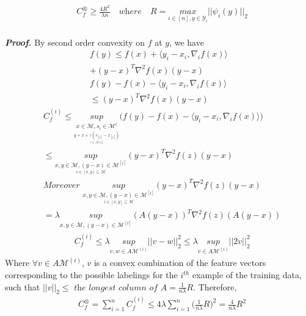 \documentclass{article}
\begin{document}
\begin{equation*}
\begin{aligned}
    &C^{\otimes}_{f} \geq \frac{4R^{2}}{\lambda n}
    \quad\textit{where} \quad R= \underset{i\in[n], y\in\mathcal{Y}_{i}}{max}||\psi_{i}(y)||_{2}
\end{aligned}
\end{equation*}
\\
\textbf{\textit{Proof.}} By second order convexity on $f$ at $y$, we have
\begin{align*}
    f(y)\leq f(x)+ \langle y_{i}-x_{i}, \nabla_{i} f(x)\rangle\\
    + (y- x)^{T}\nabla^{2}f(x)(y- x)\\
    f(y)- f(x)- \langle y_{i}-x_{i}, \nabla_{i} f(x)\rangle\\
    \leq (y- x)^{T}\nabla^{2}f(x)(y- x)
\end{align*}
\begin{equation*}
\begin{aligned}
    &C^{(i)}_{f}\leq\underset{\underset{\underset{\gamma\in[0,1]}{y=x+\gamma(s_{[i]}-x_{[i]})}}{x\in\mathcal{M},s_{i}\in\mathcal{M}^{i}}}{sup}\Big(f(y)- f(x)- \langle y_{i}-x_{i}, \nabla_{i} f(x)\rangle\Big)\\
    &\leq \underset{\underset{z\in[x,y]\subseteq\mathcal{M}}{x,y\in\mathcal{M},(y-x)\in\mathcal{M}^{[i]}}}{sup}(y- x)^{T}\nabla^{2}f(z)(y- x)\\
    &\textit{Moreover } \underset{\underset{z\in[x,y]\subseteq\mathcal{M}}{x,y\in\mathcal{M},(y-x)\in\mathcal{M}^{[i]}}}{sup}(y- x)^{T}\nabla^{2}f(z)(y- x)\\
    &= \lambda \underset{{x,y\in\mathcal{M},(y-x)\in\mathcal{M}^{[i]}}}{sup}(A(y- x))^{T}\nabla^{2}f(z)(A(y- x))
\end{aligned}
\end{equation*}
\begin{equation*}
\begin{aligned}
    &C^{(i)}_{f}\leq \lambda \underset{v,w\in A\mathcal{M}^{(i)}}{sup}||v- w||^{2}_{2}\leq \lambda \underset{v\in A\mathcal{M}^{(i)}}{sup}||2v||^{2}_{2}
\end{aligned}
\end{equation*}
Where $\forall v\in A\mathcal{M}^{(i)}$, $v$ is a convex combination of the feature vectors corresponding to the possible labelings for the $i^{th}$ example of the training data, such that $||v||_{2}\leq\textit{ the longest column of A}= \frac{1}{n\lambda}R$. Therefore,
\begin{equation*}
\begin{aligned}
    &C^{\otimes}_{f}= \sum_{i=1}^{n}C^{(i)}_{f}\leq 4\lambda\sum_{i=1}^{n}\Big(\frac{1}{n\lambda}R\Big)^{2}= \frac{4}{n\lambda}R^{2}
\end{aligned}
\end{equation*}
\end{document}
